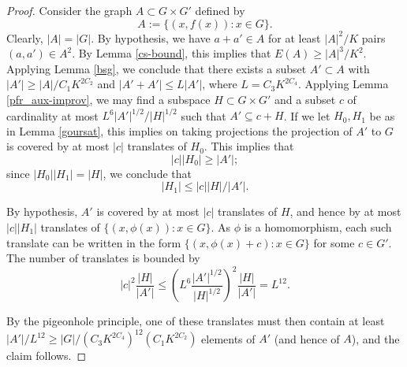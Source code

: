 \begin{proof} Consider the graph $A \subset G \times G'$ defined by
$$ A := \{ (x,f(x)): x \in G \}.$$
Clearly, $|A| = |G|$.  By hypothesis, we have $a+a' \in A$ for at least
$|A|^2/K$ pairs $(a,a') \in A^2$. By Lemma \ref{cs-bound}, this implies that
$E(A) \geq |A|^3/K^2$.  Applying Lemma \ref{bsg}, we conclude that there
exists a subset $A' \subset A$ with $|A'| \geq |A|/C_1 K^{2C_2}$ and $|A'+A'|
\leq L|A'|$, where $L = C_3 K^{2C_4}$. Applying Lemma \ref{pfr_aux-improv}, we may
find a subspace $H \subset G \times G'$
and a subset $c$ of cardinality at most $L^6 |A'|^{1/2} / |H|^{1/2}$
such that $A' \subseteq c + H$. If we let
$H_0,H_1$ be as in Lemma \ref{goursat}, this implies on taking projections
the projection of $A'$ to $G$ is covered by at most $|c|$ translates of
$H_0$.  This implies that
$$ |c| |H_0| \geq |A'|;$$
since $|H_0| |H_1| = |H|$, we conclude that
$$ |H_1| \leq |c| |H|/|A'|.$$

By hypothesis, $A'$ is covered by at most $|c|$ translates of $H$, and hence
by at most $|c| |H_1|$ translates of $\{ (x,\phi(x)): x \in G \}$.  As $\phi$
is a homomorphism, each such translate can be written in the form $\{
(x,\phi(x)+c): x \in G \}$ for some $c \in G'$. The number of translates is
bounded by
$$
|c|^2 \frac{|H|}{|A'|} \leq \left(L^6 \frac{|A'|^{1/2}}{|H|^{1/2}}\right)^2 \frac{|H|}{|A'|} = L^{12}.
$$

By the pigeonhole principle, one of these translates must then contain at
least $|A'|/L^{12} \geq |G| / (C_3 K^{2C_4})^{12} (C_1 K^{2C_2})$
elements of $A'$ (and hence of $A$), and the claim follows.
\end{proof}
